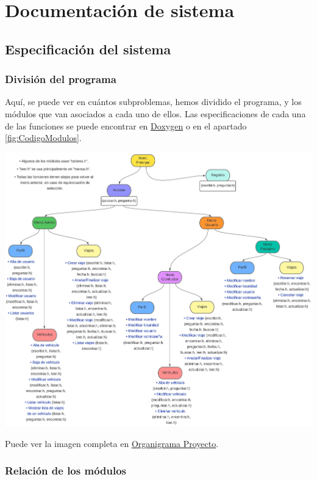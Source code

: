 

\section{Documentación de sistema}

\subsection{Especificación del sistema}

\subsubsection{División del programa}

Aquí, se puede ver en cuántos subproblemas, hemos dividido el programa, y los módulos que van asociados a cada uno de ellos.
Las especificaciones de cada una de las funciones se puede encontrar en \href{DOC_DOXYGEN/index.html}{Doxygen} o en el apartado \ref{fig:CodigoModulos}.


\begin{center}
  \includegraphics[width=1.15\textwidth]{FOTOS/Organigrama_Proyecto.jpeg}
\end{center}

Puede ver la imagen completa en \href{FOTOS/Organigrama_Proyecto.jpeg}{Organigrama Proyecto}.

\subsubsection{Relación de los módulos}

